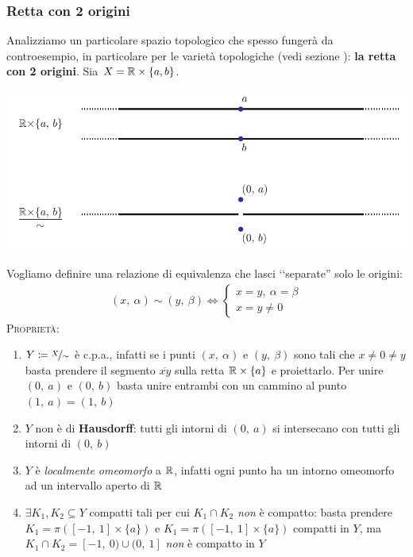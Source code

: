 \subsubsection{Retta con 2 origini} \label{retta 2 origini}
Analizziamo un particolare spazio topologico che spesso fungerà da controesempio, in particolare per le varietà topologiche (vedi sezione   ): \textbf{la retta con 2 origini}. \newline
Sia $X=\mathbb{R}\times\{a,b\}$.
\begin{center}
	\includegraphics[trim=0cm 0cm 0cm 0cm,clip,scale=0.95]{images/line2origins.pdf}
\end{center}
Vogliamo definire una relazione di equivalenza che lasci ‘‘separate'' solo le origini:
	\begin{gather*}
		(x, \ \alpha)\sim (y, \ \beta) \iff
			\begin{cases}
				x=y,\ \alpha=\beta \\
				x=y\neq 0
			\end{cases}		
	\end{gather*}
\textsc{Proprietà}:
\begin{enumerate}
	\item $Y\coloneqq \nicefrac{X}{\sim}$ è c.p.a., infatti se i punti $(x, \ \alpha)$ e $(y, \ \beta)$ sono tali che $x\neq 0 \neq y$ basta prendere il segmento $\overline{xy}$ sulla retta $\mathbb{R}\times\{a\}$ e proiettarlo. Per unire $(0,\ a)$ e $(0, \ b)$ basta unire entrambi con un cammino al punto $(1, \ a)=(1, \ b)$
	\item $Y$ non è di \textbf{Hausdorff}: tutti gli intorni di $(0, \ a)$ si intersecano con tutti gli intorni di $(0, \ b)$
	\item $Y$ è \textit{localmente omeomorfo} a $\mathbb{R}$, infatti ogni punto ha un intorno omeomorfo ad un intervallo aperto di $\mathbb{R}$
	\item $\exists K_1, K_2\subseteq Y$ compatti tali per cui $K_1\cap K_2$ \textit{non} è compatto: basta prendere $K_1=\pi\left([-1, \ 1]\times \{a\} \right)$ e $K_1=\pi\left([-1, \ 1]\times \{a\} \right)$ compatti in $Y$, ma $K_1\cap K_2= [-1,\ 0) \cup (0,\ 1]$ \textit{non} è compatto in $Y$
\end{enumerate}
